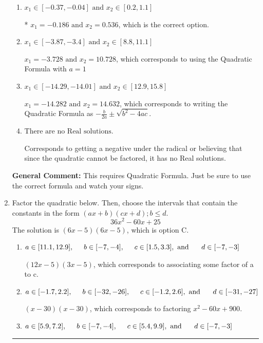 \documentclass{extbook}[14pt]
\newcommand{\litem}[1]{\item #1

\rule{\textwidth}{0.4pt}}
\begin{document}
\begin{enumerate}
{\begin{enumerate}[label=\Alph*.]
 $x_1 = -0.536 \text{ and } x_2 = 0.186$, which corresponds to writing the Quadratic Formula as $\frac{b \pm \sqrt{b^2 - 4ac}}{2a}$
\item \( x_1 \in [-0.37, -0.04] \text{ and } x_2 \in [0.2, 1.1] \)

* $x_1 = -0.186 \text{ and } x_2 = 0.536$, which is the correct option.
\item \( x_1 \in [-3.87, -3.4] \text{ and } x_2 \in [8.8, 11.1] \)

 $x_1 = -3.728 \text{ and } x_2 = 10.728$, which corresponds to using the Quadratic Formula with $a=1$
\item \( x_1 \in [-14.29, -14.01] \text{ and } x_2 \in [12.9, 15.8] \)

 $x_1 = -14.282 \text{ and } x_2 = 14.632$, which corresponds to writing the Quadratic Formula as $-\frac{b}{2a} \pm \sqrt{b^2 - 4ac}$.
\item \( \text{There are no Real solutions.} \)

Corresponds to getting a negative under the radical or believing that since the quadratic cannot be factored, it has no Real solutions.
\end{enumerate}

\textbf{General Comment:} This requires Quadratic Formula. Just be sure to use the correct formula and watch your signs.
}
\litem{
Factor the quadratic below. Then, choose the intervals that contain the constants in the form $(ax+b)(cx+d); b \leq d.$
\[ 36x^{2} -60 x + 25 \]The solution is \( (6x -5)(6x -5) \), which is option C.\begin{enumerate}[label=\Alph*.]
\item \( a \in [11.1, 12.9], \hspace*{5mm} b \in [-7, -4], \hspace*{5mm} c \in [1.5, 3.3], \text{ and } \hspace*{5mm} d \in [-7, -3] \)

 $(12x -5)(3x -5)$, which corresponds to associating some factor of a to c.
\item \( a \in [-1.7, 2.2], \hspace*{5mm} b \in [-32, -26], \hspace*{5mm} c \in [-1.2, 2.6], \text{ and } \hspace*{5mm} d \in [-31, -27] \)

 $(x -30)(x -30)$, which corresponds to factoring $x^{2} -60 x + 900$.
\item \( a \in [5.9, 7.2], \hspace*{5mm} b \in [-7, -4], \hspace*{5mm} c \in [5.4, 9.9], \text{ and } \hspace*{5mm} d \in [-7, -3] \)


\end{enumerate}}
\end{enumerate}
\end{document}
